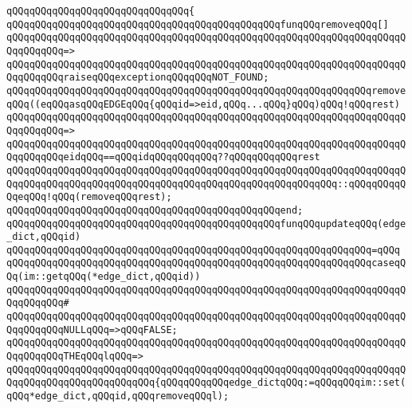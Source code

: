 \verb|qQQqqQQqqQQqqQQqqQQqqQQqqQQqqQQq{|\newline
\verb|qQQqqQQqqQQqqQQqqQQqqQQqqQQqqQQqqQQqqQQqqQQqqQQqfunqQQqremoveqQQq[]|\newline
\verb|qQQqqQQqqQQqqQQqqQQqqQQqqQQqqQQqqQQqqQQqqQQqqQQqqQQqqQQqqQQqqQQqqQQqqQQqqQQqqQQq=>|\newline
\verb|qQQqqQQqqQQqqQQqqQQqqQQqqQQqqQQqqQQqqQQqqQQqqQQqqQQqqQQqqQQqqQQqqQQqqQQqqQQqqQQqraiseqQQqexceptionqQQqqQQqNOT_FOUND;|\newline
\newline
\verb|qQQqqQQqqQQqqQQqqQQqqQQqqQQqqQQqqQQqqQQqqQQqqQQqqQQqqQQqqQQqqQQqremoveqQQq((eqQQqasqQQqEDGEqQQq{qQQqid=>eid,qQQq...qQQq}qQQq)qQQq!qQQqrest)|\newline
\verb|qQQqqQQqqQQqqQQqqQQqqQQqqQQqqQQqqQQqqQQqqQQqqQQqqQQqqQQqqQQqqQQqqQQqqQQqqQQqqQQq=>|\newline
\verb|qQQqqQQqqQQqqQQqqQQqqQQqqQQqqQQqqQQqqQQqqQQqqQQqqQQqqQQqqQQqqQQqqQQqqQQqqQQqqQQqeidqQQq==qQQqidqQQqqQQqqQQq??qQQqqQQqqQQqrest|\newline
\verb|qQQqqQQqqQQqqQQqqQQqqQQqqQQqqQQqqQQqqQQqqQQqqQQqqQQqqQQqqQQqqQQqqQQqqQQqqQQqqQQqqQQqqQQqqQQqqQQqqQQqqQQqqQQqqQQqqQQqqQQqqQQqqQQq::qQQqqQQqqQQqeqQQq!qQQq(removeqQQqrest);|\newline
\verb|qQQqqQQqqQQqqQQqqQQqqQQqqQQqqQQqqQQqqQQqqQQqqQQqend;|\newline
\newline
\verb|qQQqqQQqqQQqqQQqqQQqqQQqqQQqqQQqqQQqqQQqqQQqqQQqfunqQQqupdateqQQq(edge_dict,qQQqid)|\newline
\verb|qQQqqQQqqQQqqQQqqQQqqQQqqQQqqQQqqQQqqQQqqQQqqQQqqQQqqQQqqQQqqQQq=qQQq|\newline
\verb|qQQqqQQqqQQqqQQqqQQqqQQqqQQqqQQqqQQqqQQqqQQqqQQqqQQqqQQqqQQqqQQqcaseqQQq(im::getqQQq(*edge_dict,qQQqid))|\newline
\verb|qQQqqQQqqQQqqQQqqQQqqQQqqQQqqQQqqQQqqQQqqQQqqQQqqQQqqQQqqQQqqQQqqQQqqQQqqQQqqQQq#|\newline
\verb|qQQqqQQqqQQqqQQqqQQqqQQqqQQqqQQqqQQqqQQqqQQqqQQqqQQqqQQqqQQqqQQqqQQqqQQqqQQqqQQqNULLqQQq=>qQQqFALSE;|\newline
\newline
\verb|qQQqqQQqqQQqqQQqqQQqqQQqqQQqqQQqqQQqqQQqqQQqqQQqqQQqqQQqqQQqqQQqqQQqqQQqqQQqqQQqTHEqQQqlqQQq=>|\newline
\verb|qQQqqQQqqQQqqQQqqQQqqQQqqQQqqQQqqQQqqQQqqQQqqQQqqQQqqQQqqQQqqQQqqQQqqQQqqQQqqQQqqQQqqQQqqQQqqQQq{qQQqqQQqqQQqedge_dictqQQq:=qQQqqQQqim::set(qQQq*edge_dict,qQQqid,qQQqremoveqQQql);|\newline
